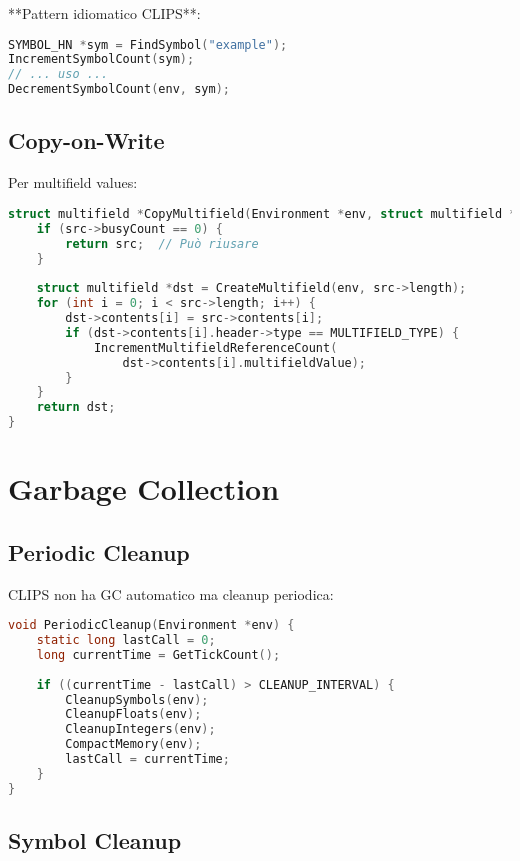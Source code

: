 **Pattern idiomatico CLIPS**:
\begin{lstlisting}[language=C]
SYMBOL_HN *sym = FindSymbol("example");
IncrementSymbolCount(sym);
// ... uso ...
DecrementSymbolCount(env, sym);
\end{lstlisting}

\subsection{Copy-on-Write}

Per multifield values:

\begin{lstlisting}[language=C]
struct multifield *CopyMultifield(Environment *env, struct multifield *src) {
    if (src->busyCount == 0) {
        return src;  // Può riusare
    }
    
    struct multifield *dst = CreateMultifield(env, src->length);
    for (int i = 0; i < src->length; i++) {
        dst->contents[i] = src->contents[i];
        if (dst->contents[i].header->type == MULTIFIELD_TYPE) {
            IncrementMultifieldReferenceCount(
                dst->contents[i].multifieldValue);
        }
    }
    return dst;
}
\end{lstlisting}

\section{Garbage Collection}

\subsection{Periodic Cleanup}

CLIPS non ha GC automatico ma cleanup periodica:

\begin{lstlisting}[language=C]
void PeriodicCleanup(Environment *env) {
    static long lastCall = 0;
    long currentTime = GetTickCount();
    
    if ((currentTime - lastCall) > CLEANUP_INTERVAL) {
        CleanupSymbols(env);
        CleanupFloats(env);
        CleanupIntegers(env);
        CompactMemory(env);
        lastCall = currentTime;
    }
}
\end{lstlisting}

\subsection{Symbol Cleanup}

